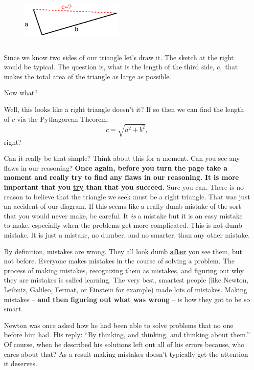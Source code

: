 \begin{figure}
\captionsetup{labelformat=empty}
\centerline{\includegraphics*[height=1in,width=2in]{Figures/Advice1}}
\label{fig:Advice1}
\end{figure}
Since we know two sides of our triangle let's draw it. The sketch at
the right would be typical. The question is,
what is the length of the third side, $c,$  that
makes the total area of the triangle as large as possible.

Now what?

Well, this looks like a right triangle doesn't it? If so then we can
find the length of $c$ via the Pythagorean Theorem:
$$
c=\sqrt{a^2+b^2},
$$
right?

Can it really be that simple? Think about this for a moment. Can you
see any flaws in our reasoning?
\vfill{}
{\Huge\bf{} Once again, before you turn the page take a moment and really
  try to find any flaws in our reasoning. It is more important that
  you \underline{try} than that you succeed.}
\vfill{}
\newpage{}
Sure you can. There is no reason to believe that the triangle we seek
must be a right triangle. That was just an accident of our diagram. If
this seems like a really dumb mistake of the sort that you would never
make, be careful. It \emph{is} a mistake but it is an easy mistake to
make, especially when the problems get more complicated. This is not
dumb mistake. It is just a mistake, no dumber, and no smarter, than
any other mistake.

By definition, mistakes are wrong. They all look dumb
\underline{\bf{}after} you see them, but not before.  Everyone makes
mistakes in the course of solving a problem. The process of making
mistakes, recognizing them as mistakes, and figuring out why they are
mistakes is called {\sc learning}.  The very best, smartest people
(like Newton, Leibniz, Galileo, Fermat, or Einstein for example) made
lots of mistakes.  Making mistakes -- {\bf and then figuring out what was
  wrong} -- is how they got to be so smart.

Newton was once asked how he had been able to solve problems that no
one before him had. His reply: ``By thinking, and thinking, and
thinking about them.'' Of course, when he described his solutions left
out all of his errors because, who cares about that? As a result
making mistakes doesn't typically get the attention it deserves.

